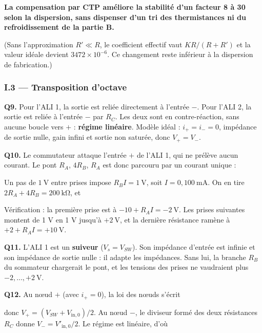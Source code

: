 \documentclass[11pt,a4paper]{article}
\newcommand{\equationajustee}[1]{%
  \sbox{\boiteequation}{$\displaystyle #1$}%
  \ifdim\wd\boiteequation>\linewidth
    \[\resizebox{\linewidth}{!}{\usebox{\boiteequation}}\]%
  \else
    \[#1\]%
  \fi}
\begin{document}
\textbf{La compensation par CTP améliore la stabilité d'un facteur 8 à 30 selon la dispersion, sans dispenser d'un tri des thermistances ni du refroidissement de la partie B.}

(Sans l'approximation \(R'\ll R\), le coefficient effectif vaut \(KR/(R+R')\) et la valeur idéale devient \(3472\times10^{-6}\). Ce changement reste inférieur à la dispersion de fabrication.)

\hypertarget{i.3-transposition-doctave}{%
\subsubsection{I.3 --- Transposition d'octave}\label{i.3-transposition-doctave}}

\textbf{Q9.} Pour l'ALI 1, la sortie est reliée directement à l'entrée \(-\). Pour l'ALI 2, la sortie est reliée à l'entrée \(-\) par \(R_C\). Les deux sont en contre-réaction, sans aucune boucle vers \(+\) : \textbf{régime linéaire}. Modèle idéal : \(i_+=i_-=0\), impédance de sortie nulle, gain infini et sortie non saturée, donc \(\boxed{V_+=V_-}\).

\textbf{Q10.} Le commutateur attaque l'entrée \(+\) de l'ALI 1, qui ne prélève aucun courant. Le pont \(R_A\), \(4R_B\), \(R_A\) est donc parcouru par un courant unique :

\equationajustee{I=\frac{20}{2R_A+4R_B}}

Un pas de \(1\ \mathrm{V}\) entre prises impose \(R_BI=1\ \mathrm{V}\), soit \(I=0{,}100\ \mathrm{mA}\). On en tire \(2R_A+4R_B=200\ \mathrm{k\Omega}\), et

\equationajustee{\boxed{R_A=80{,}0\ \mathrm{k\Omega}}}

Vérification : la première prise est à \(-10+R_AI=-2\ \mathrm{V}\). Les prises suivantes montent de 1 V en 1 V jusqu'à \(+2\ \mathrm{V}\), et la dernière résistance ramène à \(+2+R_AI=+10\ \mathrm{V}\).

\textbf{Q11.} L'ALI 1 est un \textbf{suiveur} (\(V_s=V_{SW}\)). Son impédance d'entrée est infinie et son impédance de sortie nulle : il adapte les impédances. Sans lui, la branche \(R_B\) du sommateur chargerait le pont, et les tensions des prises ne vaudraient plus \(-2,\dots,+2\ \mathrm{V}\).

\textbf{Q12.} Au nœud \(+\) (avec \(i_+=0\)), la loi des nœuds s'écrit

\equationajustee{\frac{V_{SW}-V_+}{R_B}+\frac{V_{\mathrm{in},0}-V_+}{R_B}=0}

donc \(V_+=(V_{SW}+V_{\mathrm{in},0})/2\). Au nœud \(-\), le diviseur formé des deux résistances \(R_C\) donne \(V_-=V'_{\mathrm{in},0}/2\). Le régime est linéaire, d'où
\end{document}
